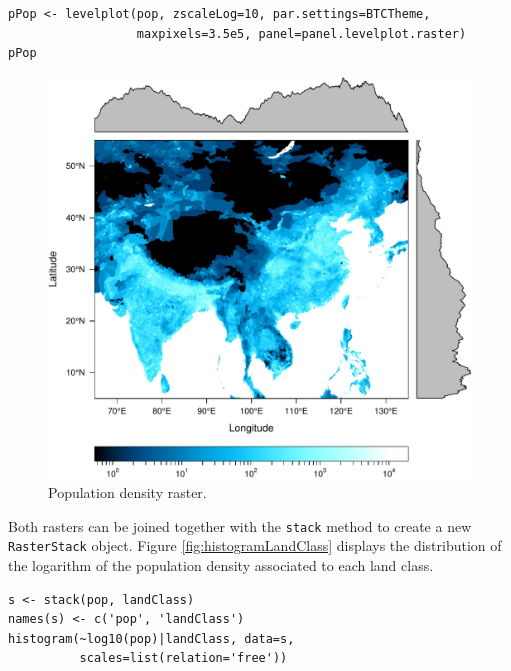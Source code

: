 \documentclass[smallroyalvopaper]{memoir}
\begin{document}
\lstset{language=R,numbers=none}
\begin{lstlisting}
pPop <- levelplot(pop, zscaleLog=10, par.settings=BTCTheme,
                  maxpixels=3.5e5, panel=panel.levelplot.raster)
pPop
\end{lstlisting}

\begin{figure}[htb]
\centering
\includegraphics[width=.9\linewidth]{figs/populationNASA.pdf}
\caption{\label{fig:populationNASA}Population density raster.}
\end{figure}

Both rasters can be joined together with the \texttt{stack} method to
create a new \texttt{RasterStack} object. Figure
\ref{fig:histogramLandClass} displays the distribution of the
logarithm of the population density associated to each land class.


\lstset{language=R,numbers=none}
\begin{lstlisting}
s <- stack(pop, landClass)
names(s) <- c('pop', 'landClass')
histogram(~log10(pop)|landClass, data=s,
          scales=list(relation='free'))
\end{lstlisting}
\end{document}
